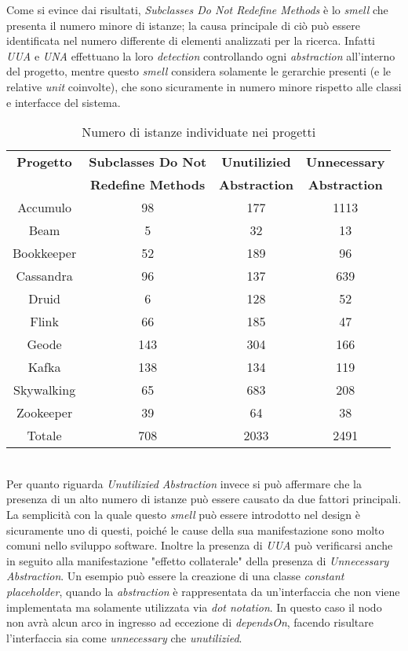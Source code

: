 Come si evince dai risultati, \textit{Subclasses Do Not Redefine Methods} è lo \textit{smell} che presenta il numero minore di istanze; la causa principale di ciò può essere identificata nel numero differente di elementi analizzati per la ricerca. Infatti \textit{UUA} e \textit{UNA} effettuano la loro \textit{detection} controllando ogni \textit{abstraction} all'interno del progetto, mentre questo \textit{smell} considera solamente le gerarchie presenti (e le relative \textit{unit} coinvolte), che sono sicuramente in numero minore rispetto alle classi e interfacce del sistema. 
\begin{table}[h]
    \centering
    \begin{tabular}{|c|c|c|c|}
        \hline
        \textbf{Progetto} & \textbf{Subclasses Do Not} & \textbf{Unutilizied} & \textbf{Unnecessary}  \\
         & \textbf{Redefine Methods} & \textbf{Abstraction} & \textbf{Abstraction}\\
        \hline
        Accumulo & 98 & 177 & 1113 \\
        Beam & 5 & 32 & 13 \\
        Bookkeeper & 52 & 189 & 96  \\
        Cassandra & 96 & 137 & 639 \\
        Druid & 6 & 128 & 52 \\
        Flink & 66 & 185 & 47 \\
        Geode & 143 & 304 & 166  \\
        Kafka & 138 & 134 & 119 \\
        Skywalking & 65 & 683 & 208\\
        Zookeeper & 39 & 64 & 38 \\
        \hline
        Totale & 708 & 2033 & 2491 \\
        \hline
    \end{tabular}
    \caption{Numero di istanze individuate nei progetti}
    \label{tab:caption}
\end{table} 
 \\
%
Per quanto riguarda \textit{Unutilizied Abstraction} invece si può affermare che la presenza di un alto numero di istanze può essere causato da due fattori principali. La semplicità con la quale questo \textit{smell} può essere introdotto nel design è sicuramente uno di questi, poiché le cause della sua manifestazione sono molto comuni nello sviluppo software.
Inoltre la presenza di \textit{UUA} può verificarsi anche in seguito alla manifestazione "effetto collaterale" della presenza di \textit{Unnecessary Abstraction}. Un esempio può essere la creazione di una classe \textit{constant placeholder}, quando la \textit{abstraction} è rappresentata da un'interfaccia che non viene implementata ma solamente utilizzata via \textit{dot notation}. In questo caso il nodo non avrà alcun arco in ingresso ad eccezione di \textit{dependsOn}, facendo risultare l'interfaccia sia come \textit{unnecessary} che \textit{unutilizied}.

